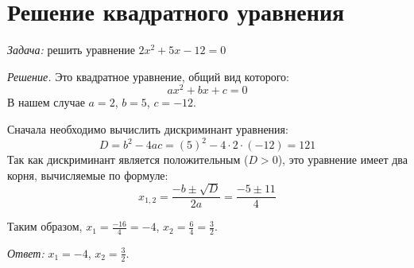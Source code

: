 \documentclass[a4paper,12pt]{article}
\begin{document}
\section{Решение квадратного уравнения}

\textit{Задача:} решить уравнение $2x^2+5x-12=0$

\textit{Решение.} Это квадратное уравнение, общий вид которого: $$ax^2+bx+c=0$$
В нашем случае $a=2$, $b=5$, $c=-12$.

    Сначала необходимо вычислить дискриминант уравнения: $$D=b^2-4ac=(5)^2-4\cdot2\cdot(-12)=121$$
Так как дискриминант является положительным ($D>0$), это уравнение имеет два корня, вычисляемые по формуле:
$$x_{1,2}=\frac{-b\pm\sqrt{D}}{2a}=\frac{-5\pm11}{4}$$

Таким образом, $x_1=\frac{-16}{4}=-4$, $x_2=\frac{6}{4}=\frac{3}{2}$.

\textit{Ответ:} $x_1=-4$, $x_2=\frac{3}{2}$.
\end{document}
